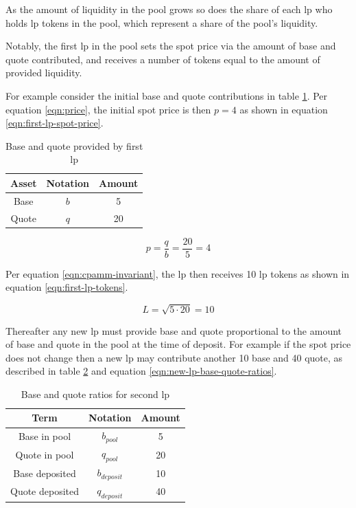 \documentclass[table, twocolumn]{article}
\begin{document}
As the amount of liquidity in the pool grows so does the share of each \gls{lp} who
holds \gls{lp} tokens in the pool, which represent a share of the pool's liquidity.

Notably, the first \gls{lp} in the pool sets the spot price via the amount of base and
quote contributed, and receives a number of tokens equal to the amount of provided
liquidity.

For example consider the initial base and quote contributions in table
\ref{tab:first-lp-amounts}.  Per equation \ref{eqn:price}, the initial spot price is
then $p = 4$ as shown in equation \ref{eqn:first-lp-spot-price}.

\begin{table}[!htb]
  \centering
  \begin{tabular}{|c|c|c|}
    \hline \rowcolor{blue}
    Asset & Notation & Amount \\ \hline
    Base  & $b$      & 5      \\ \hline
    Quote & $q$      & 20     \\ \hline
  \end{tabular}
  \caption{Base and quote provided by first \gls{lp}}
  \label{tab:first-lp-amounts}
\end{table}

\begin{equation} \label{eqn:first-lp-spot-price}
  p = \frac{q}{b} = \frac{20}{5} = 4
\end{equation}

Per equation \ref{eqn:cpamm-invariant}, the \gls{lp} then receives 10 \gls{lp} tokens as
shown in equation \ref{eqn:first-lp-tokens}.

\begin{equation} \label{eqn:first-lp-tokens}
  L = \sqrt{5 \cdot 20} = 10
\end{equation}

Thereafter any new \gls{lp} must provide base and quote proportional to the amount of
base and quote in the pool at the time of deposit. For example if the spot price does
not change then a new \gls{lp} may contribute another 10 base and 40 quote, as described
in table \ref{tab:new-lp-base-quote-ratios} and equation
\ref{eqn:new-lp-base-quote-ratios}.

\begin{table}[!htb]
  \centering
  \begin{tabular}{|c|c|c|}
    \hline \rowcolor{blue}
    Term            & Notation      & Amount \\ \hline
    Base in pool    & $b_{pool}$    & 5      \\ \hline
    Quote in pool   & $q_{pool}$    & 20     \\ \hline
    Base deposited  & $b_{deposit}$ & 10     \\ \hline
    Quote deposited & $q_{deposit}$ & 40     \\ \hline
  \end{tabular}
  \caption{Base and quote ratios for second \gls{lp}}
  \label{tab:new-lp-base-quote-ratios}
\end{table}
\end{document}
